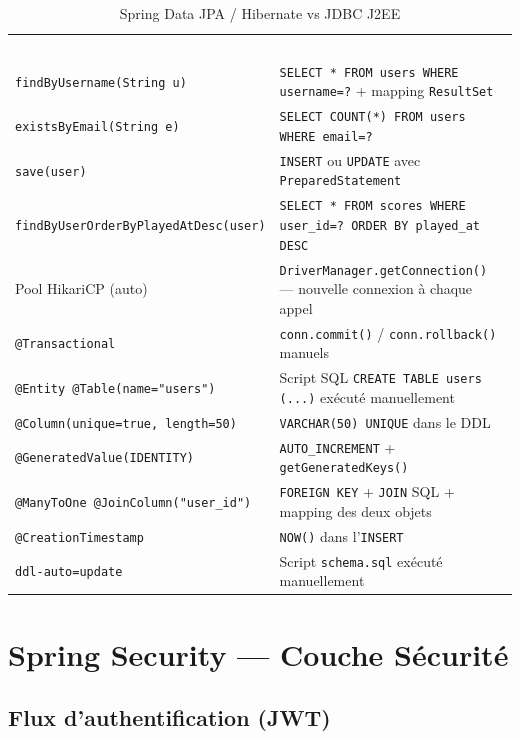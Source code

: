 \documentclass[11pt,a4paper]{article}
\newcommand{\code}[1]{\texttt{\small #1}}
\newcommand{\theadrow}[2]{%
  \rowcolor{headerbg}\textcolor{white}{\textbf{#1}} & \textcolor{white}{\textbf{#2}}\\}
\begin{document}
\begin{table}[h!]
\centering
\renewcommand{\arraystretch}{1.35}
\begin{tabularx}{\linewidth}{L{5cm} X}
\theadrow{Spring Data JPA}{Équivalent JDBC J2EE}
\code{findByUsername(String u)}            & \code{SELECT * FROM users WHERE username=?} + mapping \code{ResultSet} \\
\code{existsByEmail(String e)}             & \code{SELECT COUNT(*) FROM users WHERE email=?} \\
\code{save(user)}                          & \code{INSERT} ou \code{UPDATE} avec \code{PreparedStatement} \\
\code{findByUserOrderByPlayedAtDesc(user)} & \code{SELECT * FROM scores WHERE user\_id=? ORDER BY played\_at DESC} \\
Pool HikariCP (auto)                       & \code{DriverManager.getConnection()} — nouvelle connexion à chaque appel \\
\code{@Transactional}                      & \code{conn.commit()} / \code{conn.rollback()} manuels \\
\midrule
\code{@Entity @Table(name="users")}        & Script SQL \code{CREATE TABLE users (...)} exécuté manuellement \\
\code{@Column(unique=true, length=50)}     & \code{VARCHAR(50) UNIQUE} dans le DDL \\
\code{@GeneratedValue(IDENTITY)}           & \code{AUTO\_INCREMENT} + \code{getGeneratedKeys()} \\
\code{@ManyToOne @JoinColumn("user\_id")}  & \code{FOREIGN KEY} + \code{JOIN} SQL + mapping des deux objets \\
\code{@CreationTimestamp}                  & \code{NOW()} dans l'\code{INSERT} \\
\code{ddl-auto=update}                     & Script \code{schema.sql} exécuté manuellement \\
\bottomrule
\end{tabularx}
\caption{Spring Data JPA / Hibernate vs JDBC J2EE}
\end{table}

\section{Spring Security — Couche Sécurité}

\subsection{Flux d'authentification (JWT)}
\end{document}
